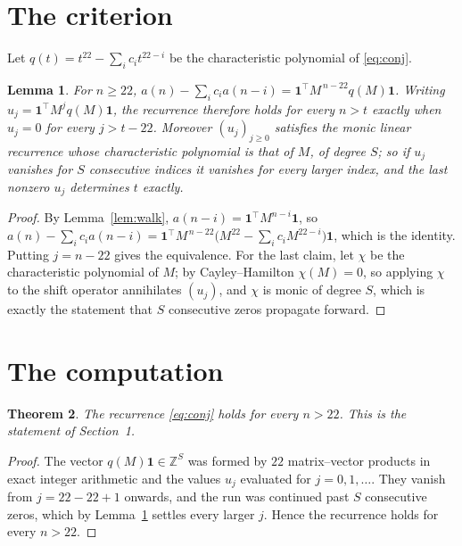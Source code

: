 \documentclass[11pt,a4paper]{article}
\theoremstyle{plain}
\newtheorem{theorem}{Theorem}
\newtheorem{lemma}[theorem]{Lemma}
\theoremstyle{definition}
\begin{document}
\section{The criterion}

Let $q(t)=t^{22}-\sum_i c_i t^{22-i}$ be the characteristic polynomial of
\eqref{eq:conj}.

\begin{lemma}\label{lem:crit}
For $n\ge22$,
$a(n)-\sum_i c_i a(n-i)=\mathbf{1}^{\!\top}M^{\,n-22}q(M)\mathbf{1}$. Writing
$u_j=\mathbf{1}^{\!\top}M^{j}q(M)\mathbf{1}$, the recurrence therefore holds for every
$n>t$ exactly when $u_j=0$ for every $j>t-22$. Moreover $(u_j)_{j\ge0}$ satisfies the
monic linear recurrence whose characteristic polynomial is that of $M$, of degree $S$; so
if $u_j$ vanishes for $S$ consecutive indices it vanishes for every larger index, and the
last nonzero $u_j$ determines $t$ exactly.
\end{lemma}

\begin{proof}
By Lemma~\ref{lem:walk}, $a(n-i)=\mathbf{1}^{\!\top}M^{n-i}\mathbf{1}$, so
$a(n)-\sum_i c_i a(n-i)
=\mathbf{1}^{\!\top}M^{\,n-22}\bigl(M^{22}-\sum_i c_i M^{22-i}\bigr)
\mathbf{1}$, which is the identity. Putting $j=n-22$ gives the equivalence. For the
last claim, let $\chi$ be the characteristic polynomial of $M$; by Cayley--Hamilton
$\chi(M)=0$, so applying $\chi$ to the shift operator annihilates $(u_j)$, and $\chi$ is
monic of degree $S$, which is exactly the statement that $S$ consecutive zeros propagate
forward.
\end{proof}

\section{The computation}

\begin{theorem}
The recurrence \eqref{eq:conj} holds for every $n>22$. This is the statement of
Section~1.
\end{theorem}

\begin{proof}
The vector $q(M)\mathbf{1}\in\mathbb{Z}^{S}$ was formed by $22$ matrix--vector
products in exact integer arithmetic and the values $u_j$ evaluated for
$j=0,1,\dots$. They vanish from $j=22-22+1$ onwards, and the run was continued past
$S$ consecutive zeros, which by Lemma~\ref{lem:crit} settles every larger $j$. Hence the
recurrence holds for every $n>22$.
\end{proof}
\end{document}
